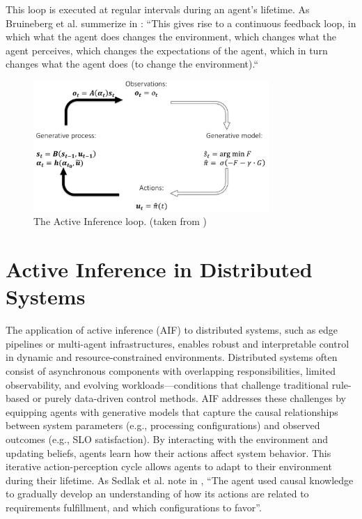 This loop is executed at regular intervals during an agent's lifetime. As Bruineberg et al. summerize in \cite{bruineberg_free-energy_2018}: ``This gives rise to a continuous feedback loop, in which what the agent does changes the environment, which changes what the agent perceives, which changes the expectations of the agent, which in turn changes what the agent does (to change the environment).``

\begin{figure}[htbp]
    \centering
    \includegraphics[width=0.8\textwidth]{img/active-inference-loop.png}
    \caption{The Active Inference loop. (taken from \cite{bruineberg_free-energy_2018})}
    \label{fig:acive-inference-loop}
\end{figure}

\section{Active Inference in Distributed Systems}
The application of active inference (AIF) to distributed systems, such as edge pipelines or multi-agent infrastructures, enables robust and interpretable control in dynamic and resource-constrained environments. Distributed systems often consist of asynchronous components with overlapping responsibilities, limited observability, and evolving workloads—conditions that challenge traditional rule-based or purely data-driven control methods. AIF addresses these challenges by equipping agents with generative models that capture the causal relationships between system parameters (e.g., processing configurations) and observed outcomes (e.g., SLO satisfaction). By interacting with the environment and updating beliefs, agents learn how their actions affect system behavior. This iterative action-perception cycle allows agents to adapt to their environment during their lifetime. As Sedlak et al. note in \cite{sedlak_active_2024}, “The agent used causal knowledge to gradually develop an understanding of how its actions are related to requirements fulfillment, and which configurations to favor”.

